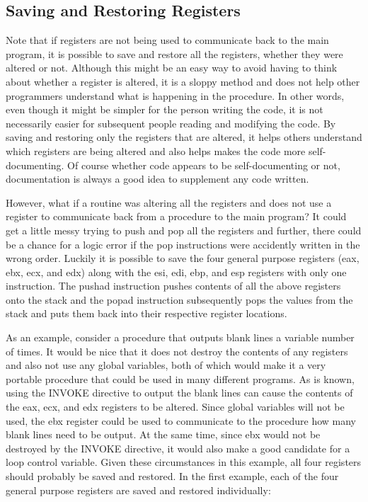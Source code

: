 \documentclass[10pt]{article}
\begin{document}
\subsection*{Saving and Restoring Registers}
Note that if registers are not being used to communicate back to the main program, it is possible to save and restore all the registers, whether they were altered or not. Although this might be an easy way to avoid having to think about whether a register is altered, it is a sloppy method and does not help other programmers understand what is happening in the procedure. In other words, even though it might be simpler for the person writing the code, it is not necessarily easier for subsequent people reading and modifying the code. By saving and restoring only the registers that are altered, it helps others understand which registers are being altered and also helps makes the code more self-documenting. Of course whether code appears to be self-documenting or not, documentation is always a good idea to supplement any code written.

However, what if a routine was altering all the registers and does not use a register to communicate back from a procedure to the main program? It could get a little messy trying to push and pop all the registers and further, there could be a chance for a logic error if the pop instructions were accidently written in the wrong order. Luckily it is possible to save the four general purpose registers (eax, ebx, ecx, and edx) along with the esi, edi, ebp, and esp registers with only one instruction. The pushad instruction pushes contents of all the above registers onto the stack and the popad instruction subsequently pops the values from the stack and puts them back into their respective register locations.

As an example, consider a procedure that outputs blank lines a variable number of times. It would be nice that it does not destroy the contents of any registers and also not use any global variables, both of which would make it a very portable procedure that could be used in many different programs. As is known, using the INVOKE directive to output the blank lines can cause the contents of the eax, ecx, and edx registers to be altered. Since global variables will not be used, the ebx register could be used to communicate to the procedure how many blank lines need to be output. At the same time, since ebx would not be destroyed by the INVOKE directive, it would also make a good candidate for a loop control variable. Given these circumstances in this example, all four registers should probably be saved and restored. In the first example, each of the four general purpose registers are saved and restored individually:
\end{document}
